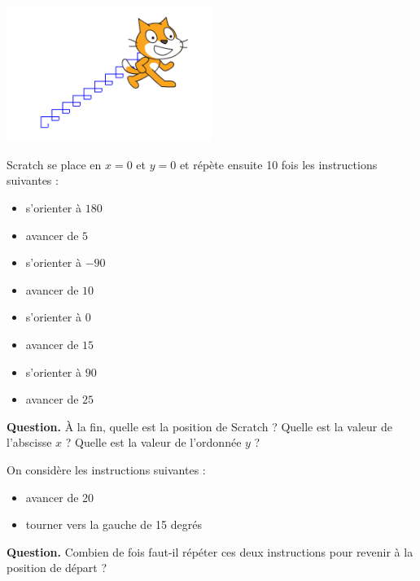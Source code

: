 \documentclass[class=report,crop=false, 12pt]{standalone}
\begin{document}

\begin{enigme}
\sauteligne

\begin{center}
  \includegraphics[width=0.5\textwidth]{ecran-02-eg1}
\end{center}

Scratch se place en $x=0$ et $y=0$ et répète ensuite 10 fois les instructions suivantes :
\begin{itemize}
  \item s’orienter à $180$\textdegree
  \item avancer de $5$
  \item s’orienter à $-90$\textdegree 
  \item avancer de $10$
  \item s’orienter à $0$\textdegree
  \item avancer de $15$
  \item s’orienter à $90$\textdegree
  \item avancer de $25$
\end{itemize}

\bigskip

\textbf{Question.} À la fin, quelle est la position de Scratch ? Quelle est la valeur de l'abscisse $x$ ? Quelle est la valeur de l'ordonnée $y$ ? 


\end{enigme}



\begin{enigme}
On considère les instructions suivantes :
\begin{itemize}
  \item avancer de 20
  \item tourner vers la gauche de 15 degrés
\end{itemize}

\bigskip

\textbf{Question.} Combien de fois faut-il répéter ces deux instructions pour revenir à la position de départ ? 


\end{enigme}
\end{document}
